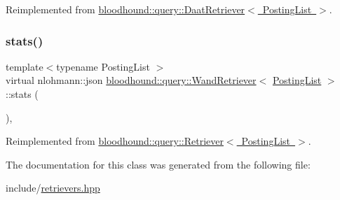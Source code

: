 Reimplemented from \mbox{\hyperlink{classbloodhound_1_1query_1_1DaatRetriever_ab80b4867fc263827dc2fdbe0965a2e8c}{bloodhound\+::query\+::\+Daat\+Retriever$<$ Posting\+List $>$}}.

\mbox{\label{classbloodhound_1_1query_1_1WandRetriever_a1e593c2cddb2ca4f2415c59ca26e6a36}} 
\subsubsection{\texorpdfstring{stats()}{stats()}}
{\footnotesize\ttfamily template$<$typename Posting\+List $>$ \\
virtual nlohmann\+::json \mbox{\hyperlink{classbloodhound_1_1query_1_1WandRetriever}{bloodhound\+::query\+::\+Wand\+Retriever}}$<$ \mbox{\hyperlink{classbloodhound_1_1PostingList}{Posting\+List}} $>$\+::stats (\begin{DoxyParamCaption}{ }\end{DoxyParamCaption})\hspace{0.3cm}{\ttfamily [inline]}, {\ttfamily [virtual]}}



Reimplemented from \mbox{\hyperlink{classbloodhound_1_1query_1_1Retriever_a58da32a5139b980ba874f8b5e6bb89ec}{bloodhound\+::query\+::\+Retriever$<$ Posting\+List $>$}}.



The documentation for this class was generated from the following file\+:\begin{DoxyCompactItemize}
\item 
include/\mbox{\hyperlink{retrievers_8hpp}{retrievers.\+hpp}}\end{DoxyCompactItemize}
